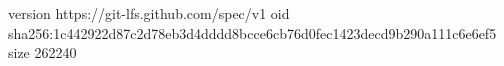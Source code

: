 version https://git-lfs.github.com/spec/v1
oid sha256:1c442922d87c2d78eb3d4dddd8bcce6cb76d0fec1423decd9b290a111c6e6ef5
size 262240
